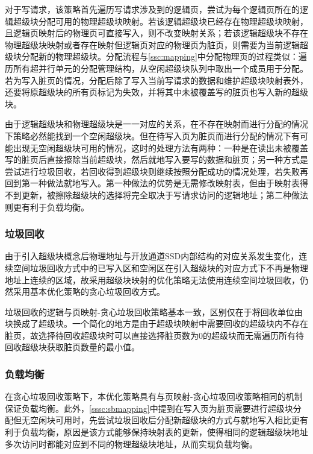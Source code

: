 对于写请求，该策略首先遍历写请求涉及到的逻辑页，尝试为每个逻辑页所在的逻辑超级块分配可用的物理超级块映射。若该逻辑超级块已经存在物理超级块映射，且逻辑页映射后的物理页可直接写入，则不改变映射关系；若该逻辑超级块不存在物理超级块映射或者存在映射但逻辑页对应的物理页为脏页，则需要为当前逻辑超级块分配新的物理超级块。分配流程与\ref{ssc:mapping}中分配物理页的过程类似：遍历所有超并行单元的分配管理结构，从空闲超级块队列中取出一个成员用于分配。若为写入脏页的情况，分配后除了写入当前写请求的数据和维护超级块映射表外，还要将原超级块的所有页标记为失效，并将其中未被覆盖写的脏页也写入新的超级块。

由于逻辑超级块和物理超级块是一一对应的关系，在不存在映射而进行分配的情况下策略必然能找到一个空闲超级块。但在待写入页为脏页而进行分配的情况下有可能出现无空闲超级块可用的情况，这时的处理方法有两种：一种是在读出未被覆盖写的脏页后直接擦除当前超级块，然后就地写入要写的数据和脏页；另一种方式是尝试进行垃圾回收，若回收得到超级块则继续按照分配成功的情况处理，若失败再回到第一种做法就地写入。第一种做法的优势是无需修改映射表，但由于映射表得不到更新，被擦除超级块的选择将完全取决于写请求访问的逻辑地址；第二种做法则更有利于负载均衡。

\subsubsection{垃圾回收}
由于引入超级块概念后物理地址与开放通道SSD内部结构的对应关系发生变化，连续空间垃圾回收方式中的已写入区和空闲区在引入超级块的对应方式下不再是物理地址上连续的区域，故采用超级块映射的优化策略无法使用连续空间垃圾回收，仍然采用基本优化策略的贪心垃圾回收方式。

垃圾回收的逻辑与页映射-贪心垃圾回收策略基本一致，区别仅在于将回收单位由块换成了超级块。一个简化的地方是由于超级块映射中需要回收的超级块内不存在脏页，故选择待回收超级块时可以直接选择脏页数为0的超级块而无需遍历所有待回收超级块获取脏页数量的最小值。

\subsubsection{负载均衡}
在贪心垃圾回收策略下，本优化策略具有与页映射-贪心垃圾回收策略相同的机制保证负载均衡。此外，\ref{sssc:sbmapping}中提到在写入页为脏页需要进行超级块分配但无空闲块可用时，先尝试垃圾回收后分配新超级块的方式与就地写入相比更有利于负载均衡，原因是该方式能够保持映射表的更新，使得相同的逻辑超级块地址多次访问时都能对应到不同的物理超级块地址，从而实现负载均衡。

